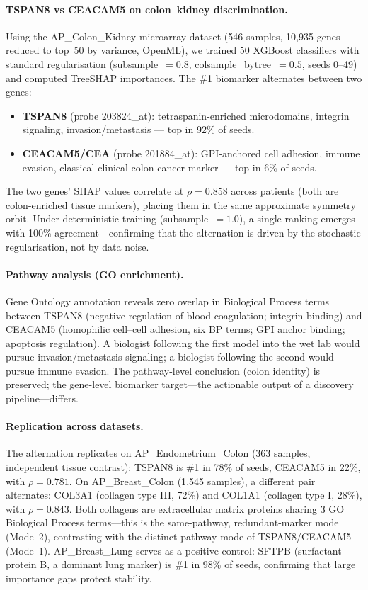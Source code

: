 \documentclass[11pt,a4paper]{article}
\begin{document}
\paragraph{TSPAN8 vs CEACAM5 on colon--kidney discrimination.}
Using the AP\_Colon\_Kidney microarray dataset (546 samples, 10{,}935 genes reduced to top~50 by variance, OpenML), we trained 50 XGBoost classifiers with standard regularisation (subsample~$= 0.8$, colsample\_bytree~$= 0.5$, seeds 0--49) and computed TreeSHAP importances.  The \#1 biomarker alternates between two genes:
\begin{itemize}
  \item \textbf{TSPAN8} (probe 203824\_at): tetraspanin-enriched microdomains, integrin signaling, invasion/metastasis --- top in 92\% of seeds.
  \item \textbf{CEACAM5/CEA} (probe 201884\_at): GPI-anchored cell adhesion, immune evasion, classical clinical colon cancer marker --- top in 6\% of seeds.
\end{itemize}
The two genes' SHAP values correlate at $\rho = 0.858$ across patients (both are colon-enriched tissue markers), placing them in the same approximate symmetry orbit.  Under deterministic training (subsample~$= 1.0$), a single ranking emerges with 100\% agreement---confirming that the alternation is driven by the stochastic regularisation, not by data noise.

\paragraph{Pathway analysis (GO enrichment).}
Gene Ontology annotation reveals zero overlap in Biological Process terms between TSPAN8 (negative regulation of blood coagulation; integrin binding) and CEACAM5 (homophilic cell--cell adhesion, six BP terms; GPI anchor binding; apoptosis regulation).  A biologist following the first model into the wet lab would pursue invasion/metastasis signaling; a biologist following the second would pursue immune evasion.  The pathway-level conclusion (colon identity) is preserved; the gene-level biomarker target---the actionable output of a discovery pipeline---differs.

\paragraph{Replication across datasets.}
The alternation replicates on AP\_Endometrium\_Colon (363 samples, independent tissue contrast): TSPAN8 is \#1 in 78\% of seeds, CEACAM5 in 22\%, with $\rho = 0.781$.  On AP\_Breast\_Colon (1{,}545 samples), a different pair alternates: COL3A1 (collagen type III, 72\%) and COL1A1 (collagen type I, 28\%), with $\rho = 0.843$.  Both collagens are extracellular matrix proteins sharing 3 GO Biological Process terms---this is the same-pathway, redundant-marker mode (Mode~2), contrasting with the distinct-pathway mode of TSPAN8/CEACAM5 (Mode~1).  AP\_Breast\_Lung serves as a positive control: SFTPB (surfactant protein B, a dominant lung marker) is \#1 in 98\% of seeds, confirming that large importance gaps protect stability.
\end{document}
